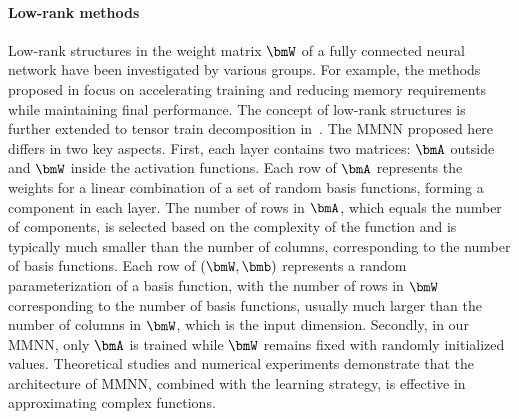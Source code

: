 \documentclass[review,hidelinks,onefignum,onetabnum]{siamart250211}
\begin{document}
\paragraph{Low-rank methods}
Low-rank structures in the weight matrix $\bmW$ of a fully connected neural network have been investigated by various groups. For example, the methods proposed in \cite{2022arXiv220913569R,9157223,6638949} focus on accelerating training and reducing memory requirements while maintaining final performance. The concept of low-rank structures is further extended to tensor train decomposition in~\cite{novikov2015tensorizing}.
The MMNN proposed here differs in two key aspects. First, each layer contains two matrices: $\bmA$ outside and $\bmW$ inside the activation functions. Each row of $\bmA$ represents the weights for a linear combination of a set of random basis functions, forming a component in each layer. The number of rows in $\bmA$, which equals the number of components, is selected based on the complexity of the function and is typically much smaller than the number of columns, corresponding to the number of basis functions. Each row of $(\bmW, \bmb)$ represents a random parameterization of a basis function, with the number of rows in $\bmW$ corresponding to the number of basis functions, usually much larger than the number of columns in $\bmW$, which is the input dimension.
Secondly, in our MMNN, only $\bmA$ is trained while $\bmW$ remains fixed with randomly initialized values. Theoretical studies and numerical experiments demonstrate that the architecture of MMNN, combined with the learning strategy, is effective in approximating complex functions.


\end{document}
